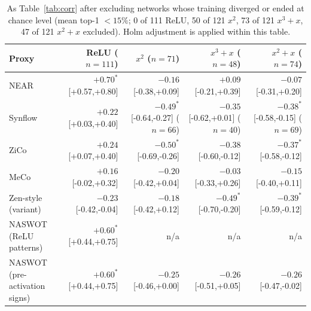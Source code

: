 \begin{table}[h]
\centering
\caption{As Table~\ref{tab:corr} after excluding networks whose training diverged or ended at chance level
  (mean top-1 $<15\%$; 0 of 111 ReLU, 50 of 121 $x^2$, 73 of 121 $x^3{+}x$, 47 of 121 $x^2{+}x$ excluded).  Holm adjustment is applied within this table.}
\label{tab:corrnofail}
\small
\begin{tabular}{lrrrr}
\toprule
\textbf{Proxy} & \textbf{ReLU} ($n{=}111$) & \textbf{$x^2$} ($n{=}71$) & \textbf{$x^3{+}x$} ($n{=}48$) & \textbf{$x^2{+}x$} ($n{=}74$) \\
\midrule
NEAR & $+0.70^{*}$ {\scriptsize[+0.57,+0.80]} & $-0.16$ {\scriptsize[-0.38,+0.09]} & $+0.09$ {\scriptsize[-0.21,+0.39]} & $-0.07$ {\scriptsize[-0.31,+0.20]} \\
Synflow & $+0.22$ {\scriptsize[+0.03,+0.40]} & $-0.49^{*}$ {\scriptsize[-0.64,-0.27]} {\scriptsize($n{=}66$)} & $-0.35$ {\scriptsize[-0.62,+0.01]} {\scriptsize($n{=}40$)} & $-0.38^{*}$ {\scriptsize[-0.58,-0.15]} {\scriptsize($n{=}69$)} \\
ZiCo & $+0.24$ {\scriptsize[+0.07,+0.40]} & $-0.50^{*}$ {\scriptsize[-0.69,-0.26]} & $-0.38$ {\scriptsize[-0.60,-0.12]} & $-0.37^{*}$ {\scriptsize[-0.58,-0.12]} \\
MeCo & $+0.16$ {\scriptsize[-0.02,+0.32]} & $-0.20$ {\scriptsize[-0.42,+0.04]} & $-0.03$ {\scriptsize[-0.33,+0.26]} & $-0.15$ {\scriptsize[-0.40,+0.11]} \\
Zen-style (variant) & $-0.23$ {\scriptsize[-0.42,-0.04]} & $-0.18$ {\scriptsize[-0.42,+0.12]} & $-0.49^{*}$ {\scriptsize[-0.70,-0.20]} & $-0.39^{*}$ {\scriptsize[-0.59,-0.12]} \\
NASWOT (ReLU patterns) & $+0.60^{*}$ {\scriptsize[+0.44,+0.75]} & n/a & n/a & n/a \\
NASWOT (pre-activation signs) & $+0.60^{*}$ {\scriptsize[+0.44,+0.75]} & $-0.25$ {\scriptsize[-0.46,+0.00]} & $-0.26$ {\scriptsize[-0.51,+0.05]} & $-0.26$ {\scriptsize[-0.47,-0.02]} \\
\bottomrule
\end{tabular}
\end{table}
